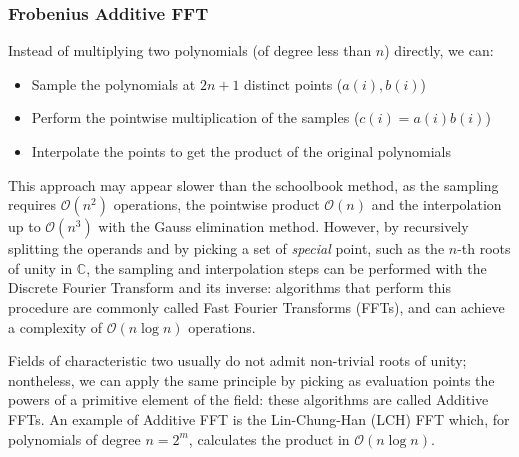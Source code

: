 \documentclass[11pt,a4paper,twocolumn]{article}
\theoremstyle{definition}
\begin{document}
\subsubsection{Frobenius Additive FFT}
Instead of multiplying two polynomials (of degree less than $n$) directly, we can:
\begin{itemize}
    \item Sample the polynomials at $2n+1$ distinct points ($a(i), b(i)$)
    \item Perform the pointwise multiplication of the samples ($c(i) = a(i)b(i)$)
    \item Interpolate the points to get the product of the original polynomials
\end{itemize}
This approach may appear slower than the schoolbook method, as the sampling requires $\mathcal{O}(n^2)$ operations,
the pointwise product $\mathcal{O}(n)$ and the interpolation up to $\mathcal{O}(n^3)$ with the Gauss elimination method. 
However, by recursively splitting the operands and by picking a set of \emph{special} point, such as the $n$-th roots of unity in $\mathds{C}$, 
the sampling and interpolation steps can be performed with the Discrete Fourier Transform and its inverse:
algorithms that perform this procedure are commonly called Fast Fourier Transforms (FFTs), and can achieve a
complexity of $\mathcal{O}(n \log{n})$ operations.

Fields of characteristic two usually do not admit non-trivial roots of unity; nontheless, we can apply the same
principle by picking as evaluation points the powers of a primitive element of the field: these algorithms are called
Additive FFTs.
An example of Additive FFT is the Lin-Chung-Han (LCH) FFT which, for polynomials of degree
$n=2^m$, calculates the product in $\mathcal{O}(n\log{n})$.
\end{document}
